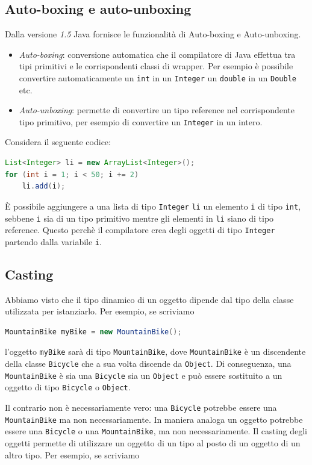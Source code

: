 \documentclass{article}
\begin{document}
\subsection{Auto-boxing e auto-unboxing}
Dalla versione \emph{1.5} Java fornisce le funzionalit\`a di Auto-boxing e Auto-unboxing.
\begin{itemize}
\item \emph{Auto-boxing}: conversione automatica che il compilatore di Java effettua tra tipi primitivi e le corrispondenti classi di wrapper.
Per esempio \`e possibile convertire automaticamente un \texttt{int} in un \texttt{Integer} un \texttt{double} in un \texttt{Double} etc.\\
\item \emph{Auto-unboxing}: permette di convertire un tipo reference nel corrispondente tipo primitivo, per esempio di convertire un \texttt{Integer} in un intero.
\end{itemize}
Considera il seguente codice:
\begin{lstlisting}[language=Java,escapechar=|]
List<Integer> li = new ArrayList<Integer>();
for (int i = 1; i < 50; i += 2)
    li.add(i);
\end{lstlisting}
\`E possibile aggiungere a una lista di tipo \texttt{Integer} \texttt{li} un elemento \texttt{i} di tipo \texttt{int}, sebbene \texttt{i} sia di un tipo primitivo mentre gli elementi in \texttt{li} siano di tipo reference. Questo perch\`e il compilatore crea degli oggetti di tipo \texttt{Integer} partendo dalla variabile \texttt{i}.

\subsection{Casting}
Abbiamo visto che il tipo dinamico di un oggetto dipende dal tipo della classe utilizzata per istanziarlo. Per esempio, se scriviamo
\begin{lstlisting}[language=Java,escapechar=|]
MountainBike myBike = new MountainBike();
\end{lstlisting}
l'oggetto \texttt{myBike} sar\`a di tipo \texttt{MountainBike}, dove  \texttt{MountainBike} \`e un discendente della classe \texttt{Bicycle} che a sua volta discende da \texttt{Object}. Di conseguenza, una \texttt{MountainBike} \`e sia una \texttt{Bicycle} sia un \texttt{Object} e pu\`o essere sostituito a un oggetto di tipo \texttt{Bicycle} o \texttt{Object}.

Il contrario non \`e necessariamente vero: una \texttt{Bicycle} potrebbe essere una \texttt{MountainBike} ma non necessariamente. In maniera analoga un oggetto potrebbe essere una \texttt{Bicycle} o una \texttt{MountainBike}, ma non necessariamente. Il casting degli oggetti permette di utilizzare un oggetto di un tipo al posto di un oggetto di un altro tipo. Per esempio, se scriviamo 
\end{document}
